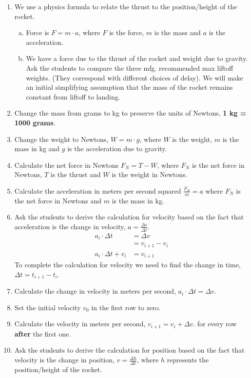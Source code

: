 \documentclass [12pt, letterpaper, titlepage] {article}
\begin{document}
\begin{enumerate}
	\item{We use a physics formula to relate the thrust to the position/height of the rocket.
		\begin{enumerate}[a.]
			\item{Force is $F=m \cdot a$, where $F$ is the force, $m$ is the mass and $a$ is the acceleration.}
			\item{We have a force due to the thrust of the rocket and weight due to gravity. Ask the students to compare the three mfg. recommended max liftoff weights. (They correspond with different choices of delay). We will make an initial simplifying assumption that the mass of the rocket remains constant from liftoff to landing.}		
		\end{enumerate}
	}
	\item{Change the mass from grams to kg to preserve the units of Newtons, \textbf{1 kg = 1000 grams}.}
	\item{Change the weight to Newtons, $W = m \cdot g$, where $W$ is the weight, $m$ is the mass in kg and $g$ is the acceleration due to gravity.}
	\item{Calculate the net force in Newtons $F_N = T - W$, where $F_N$ is the net force in Newtons, $T$ is the thrust and $W$ is the weight in Newtons.}
	\item{Calculate the acceleration in meters per second squared $\displaystyle \frac{F_N}{m}=a$ where $F_N$ is the net force in Newtons and $m$ is the mass in kg.}
	\item{Ask the students to derive the calculation for velocity based on the fact that acceleration is the change in velocity, $\displaystyle a=\frac{\Delta v}{\Delta t}$.
	\begin{align*}
	a_{i} \cdot \Delta t 		&= \Delta v \\
					 	&= v_{i+1}-v_i \\
	a_{i} \cdot \Delta t + v_i	&= v_{i+1}
	\end{align*}
	To complete the calculation for velocity we need to find the change in time, $\Delta t = t_{i+1}-t_i$. 
	}
	\item{Calculate the change in velocity in meters per second, $a_{i} \cdot \Delta t = \Delta v$.}
	\item{Set the initial velocity $v_0$ in the first row to zero.}
	\item{Calculate the velocity in meters per second, $v_{i+1}=v_i+\Delta v$. for every row \textbf{after} the first one.}
	\item{Ask the students to derive the calculation for position based on the fact that velocity is the change in position, $\displaystyle v=\frac{\Delta h}{\Delta t}$, where $h$ represents the position/height of the rocket.
}
\end{enumerate}
\end{document}

